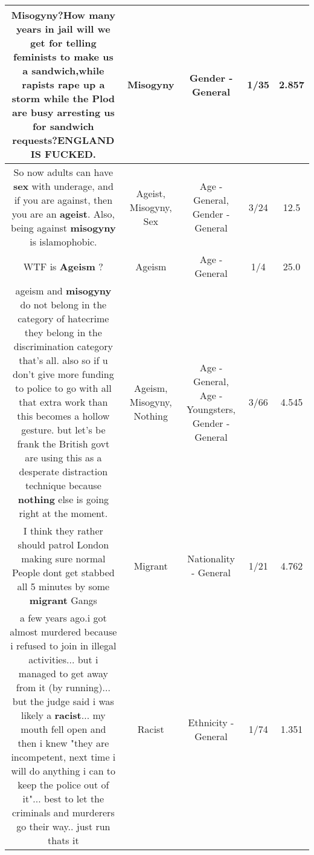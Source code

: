 \documentclass[11pt]{article}
\newlength\mylength
\begin{document}
\begin{center}
\begin{longtable}{|C{.65\mylength}|C{.30\mylength}|C{.12\mylength}|C{.12\mylength}|C{.12\mylength}|}
  \small Misogyny?How many years in jail will we get for telling feminists to make us a sandwich,while rapists rape up a storm while the Plod are busy arresting us for sandwich requests?ENGLAND IS FUCKED.\normalsize   & Misogyny & Gender - General & 1/35 & 2.857 \\  \hline
  \small So now adults can have \textbf{sex} with underage, and if you are against, then you are an \textbf{ageist}. Also, being against \textbf{misogyny} is islamophobic.\normalsize   & Ageist, Misogyny, Sex & Age - General, Gender - General & 3/24 & 12.5 \\  \hline
  \small WTF is \textbf{Ageism} ?\normalsize   & Ageism & Age - General & 1/4 & 25.0 \\  \hline
  \small ageism and \textbf{misogyny} do not belong in the category of hatecrime  they belong in the discrimination category that's all. also so if u don't give more funding to police to go with all that extra work than this becomes a hollow gesture. but let's be frank the British govt are using this as a desperate distraction technique because \textbf{nothing} else is going right at the moment.\normalsize   & Ageism, Misogyny, Nothing & Age - General, Age - Youngsters, Gender - General & 3/66 & 4.545 \\  \hline
  \small I think they rather should patrol London making sure normal People dont get stabbed all 5 minutes by some \textbf{migrant} Gangs\normalsize   & Migrant & Nationality - General & 1/21 & 4.762 \\  \hline
  \small a few years ago.i got almost murdered because i refused to join in illegal activities... but i managed to get away from it (by running)... but the judge said i was likely a \textbf{racist}... my mouth fell open and then i knew "they are incompetent, next time i will do anything i can to keep the police out of it"... best to let the criminals and murderers go their way.. just run thats it\normalsize   & Racist & Ethnicity - General & 1/74 & 1.351 \\  \hline

\end{longtable}
\end{center}
\end{document}
